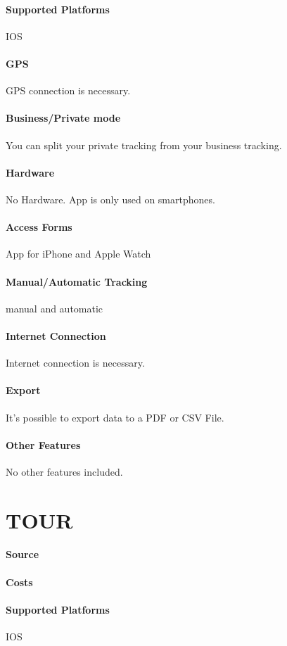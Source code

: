 \paragraph{Supported Platforms} IOS
\paragraph{GPS} GPS connection is necessary.
\paragraph{Business/Private mode} You can split your private tracking from your business tracking.
\paragraph{Hardware} No Hardware. App is only used on smartphones.
\paragraph{Access Forms} App for iPhone and Apple Watch
\paragraph{Manual/Automatic Tracking} manual and automatic
\paragraph{Internet Connection} Internet connection is necessary.
\paragraph{Export} It’s possible to export data to a PDF or CSV File.
\paragraph{Other Features} No other features included.
\newpage
\section{TOUR}
\paragraph{Source} 
\paragraph{Costs} 
\paragraph{Supported Platforms} IOS
